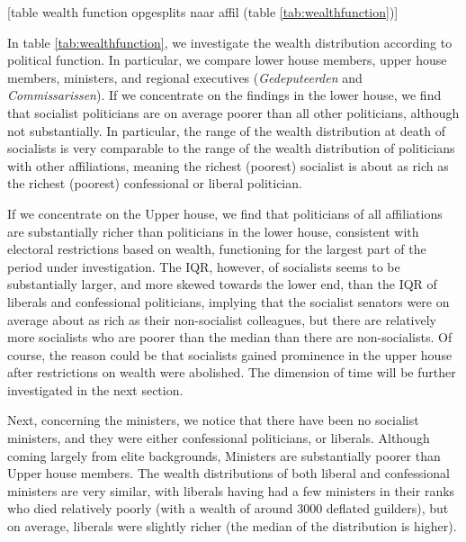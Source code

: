 \begin{center}
    
    [table wealth function opgesplits naar affil (table \ref{tab:wealthfunction})]
\end{center}

    In table \ref{tab:wealthfunction}, we investigate the wealth distribution according to political function. In particular, we compare lower house members, upper house members, ministers, and regional executives (\textit{Gedeputeerden} and \textit{Commissarissen}). If we concentrate on the findings in the lower house, we find that socialist politicians are on average poorer than all other politicians, although not substantially. In particular, the range of the wealth distribution at death of socialists is very comparable to the range of the wealth distribution of politicians with other affiliations, meaning the richest (poorest) socialist is about as rich as the richest (poorest) confessional or liberal politician. 
    
    If we concentrate on the Upper house, we find that politicians of all affiliations are substantially richer than politicians in the lower house, consistent with electoral restrictions based on wealth, functioning for the largest part of the period under investigation. \autocite{moes1994lijsten} The IQR, however, of socialists seems to be substantially larger, and more skewed towards the lower end, than the IQR of liberals and confessional politicians, implying that the socialist senators were on average about as rich as their non-socialist colleagues, but there are relatively more socialists who are poorer than the median than there are non-socialists. Of course, the reason could be that socialists gained prominence in the upper house after restrictions on wealth were abolished. The dimension of time will be further investigated in the next section. 
    
    Next, concerning the ministers, we notice that there have been no socialist ministers, and they were either confessional politicians, or liberals. Although coming largely from elite backgrounds, Ministers are substantially poorer than Upper house members.\autocite{secker1991ministers} The wealth distributions of both liberal and confessional ministers are very similar, with liberals having had a few ministers in their ranks who died relatively poorly (with a wealth of around 3000 deflated guilders), but on average, liberals were slightly richer (the median of the distribution is higher). 
    
